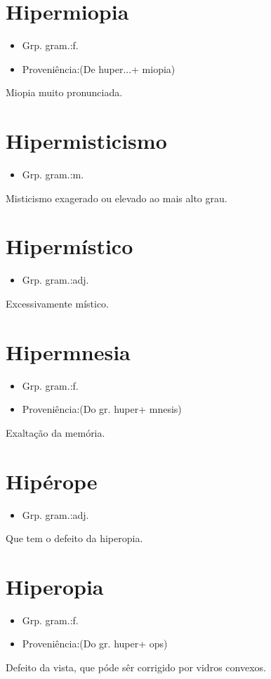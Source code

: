 \documentclass{article}
\begin{document}
\section{Hipermiopia}
\begin{itemize}
\item {Grp. gram.:f.}
\end{itemize}
\begin{itemize}
\item {Proveniência:(De \textunderscore huper...\textunderscore  + \textunderscore miopia\textunderscore )}
\end{itemize}
Miopia muito pronunciada.
\section{Hipermisticismo}
\begin{itemize}
\item {Grp. gram.:m.}
\end{itemize}
Misticismo exagerado ou elevado ao mais alto grau.
\section{Hipermístico}
\begin{itemize}
\item {Grp. gram.:adj.}
\end{itemize}
Excessivamente místico.
\section{Hipermnesia}
\begin{itemize}
\item {Grp. gram.:f.}
\end{itemize}
\begin{itemize}
\item {Proveniência:(Do gr. \textunderscore huper\textunderscore  + \textunderscore mnesis\textunderscore )}
\end{itemize}
Exaltação da memória.
\section{Hipérope}
\begin{itemize}
\item {Grp. gram.:adj.}
\end{itemize}
Que tem o defeito da hiperopia.
\section{Hiperopia}
\begin{itemize}
\item {Grp. gram.:f.}
\end{itemize}
\begin{itemize}
\item {Proveniência:(Do gr. \textunderscore huper\textunderscore  + \textunderscore ops\textunderscore )}
\end{itemize}
Defeito da vista, que póde sêr corrigido por vidros convexos.
\end{document}
